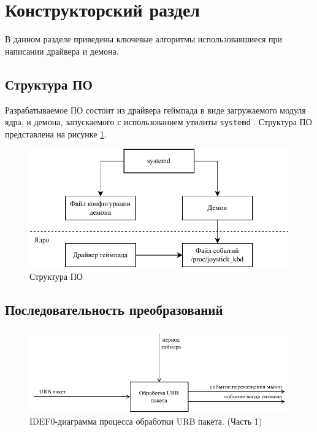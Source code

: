 \section{Конструкторский раздел}

В данном разделе приведены ключевые алгоритмы использовавшиеся при написании драйвера и демона.

\subsection{Структура ПО}

Разрабатываемое ПО состоит из драйвера геймпада в виде загружаемого модуля ядра, и демона, запускаемого с использованием утилиты \texttt{systemd} \cite{systemd}. Структура ПО представлена на рисунке \ref{fig:po-struct}.

\begin{figure}[ht]
    \centering
    \includegraphics[width=\linewidth]{img/po-structure.pdf}
    \caption{Структура ПО}
    \label{fig:po-struct}
\end{figure}

\clearpage

\subsection{Последовательность преобразований}

\begin{figure}[ht]
    \centering
    \includegraphics[width=\linewidth]{img/idef0-A0.pdf}
    \caption{IDEF0-диаграмма процесса обработки URB пакета. (Часть 1)}
\end{figure}

